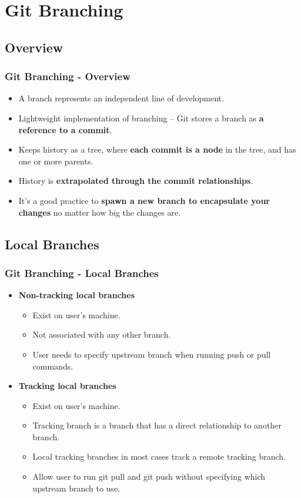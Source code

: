 \section[Git Branching]{Git Branching}
\subsection[]{Overview}
\begin{frame}
\frametitle{Git Branching - Overview}
\begin{itemize}
	\item A branch represents an independent line of development.
	\item Lightweight implementation of branching – Git stores a branch as \textbf{a reference to a commit}.
	\item Keeps history as a tree, where \textbf{each commit is a node} in the tree, and has one or more parents.
	\item History is \textbf{extrapolated through the commit relationships}.
	\item It’s a good practice to \textbf{spawn a new branch to encapsulate your changes} no matter how big the changes are.
\end{itemize}
\end{frame}



\subsection[]{Local Branches}
\begin{frame}
\frametitle{Git Branching - Local Branches}
\begin{itemize}
	\item \textbf{Non-tracking local branches}
		\begin{itemize}
		\item Exist on user’s machine.
		\item Not associated with any other branch.
		\item User needs to specify upstream branch when running push or pull commands.
		\end{itemize}
	\item \textbf{Tracking local branches}
		\begin{itemize}
		\item Exist on user’s machine.
		\item Tracking branch is a branch that has a direct relationship to another branch.
		\item Local tracking branches in most cases track a remote tracking branch.
		\item Allow user to run git pull and git push without specifying which upstream branch to use.
		\end{itemize}
\end{itemize}
\end{frame}

